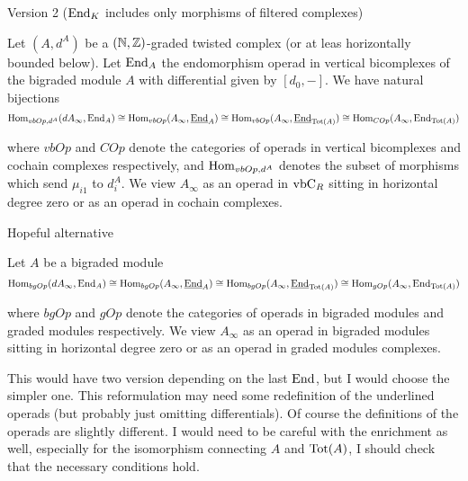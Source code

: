 \documentclass[twoside]{article}
\begin{document}
Version 2 ($\operatorname{End}_K$ includes only morphisms of filtered complexes)
 \begin{thm}
Let $(A,d^A)$ be a  $(\mathbb{N},\mathbb{Z})$-graded twisted complex (or at leas horizontally bounded below). Let $\operatorname{End}_A$ the endomorphism operad in vertical bicomplexes of the bigraded module $A$ with differential given by $[d_0,-]$. We have natural bijections
\[\operatorname{Hom}_{vbOp,d^A}(dA_\infty,\operatorname{End}_A)\cong \operatorname{Hom}_{vbOp}(A_\infty,\underline{\operatorname{End}}_A)\cong  \operatorname{Hom}_{vbOp}(A_\infty,\underline{\operatorname{End}}_{\mathrm{Tot}(A)})\cong\operatorname{Hom}_{COp}(A_\infty,\operatorname{End}_{\mathrm{Tot}(A)})\]

where $vbOp$ and $COp$ denote the categories of operads in vertical bicomplexes and cochain complexes respectively, and $\operatorname{Hom}_{vbOp,d^A}$ denotes the subset of morphisms which send $μ_{i1}$ to $d^A_i$. We view $A_∞$ as an operad in $\mathrm{vbC}_R$ sitting in
horizontal degree zero or as an operad in cochain complexes.
\end{thm}

Hopeful alternative
\begin{thm}
Let $A$ be a bigraded module
\[\operatorname{Hom}_{bgOp}(dA_\infty,\operatorname{End}_A)\cong \operatorname{Hom}_{bgOp}(A_\infty,\underline{\operatorname{End}}_A)\cong  \operatorname{Hom}_{bgOp}(A_\infty,\underline{\operatorname{End}}_{\mathrm{Tot}(A)})\cong\operatorname{Hom}_{gOp}(A_\infty,\operatorname{End}_{\mathrm{Tot}(A)})\]

where $bgOp$ and $gOp$ denote the categories of operads in bigraded modules and graded modules respectively. We view $A_∞$ as an operad in bigraded modules sitting in
horizontal degree zero or as an operad in graded modules complexes.
\end{thm}
This would have two version depending on the last $\operatorname{End}$, but I would choose the simpler one. This reformulation may need some redefinition of the underlined operads (but probably just omitting differentials). Of course the definitions of the operads are slightly different. I would need to be careful with the enrichment as well, especially for the isomorphism connecting $A$ and $\mathrm{Tot}(A)$, I should check that the necessary conditions hold.
\end{document}
